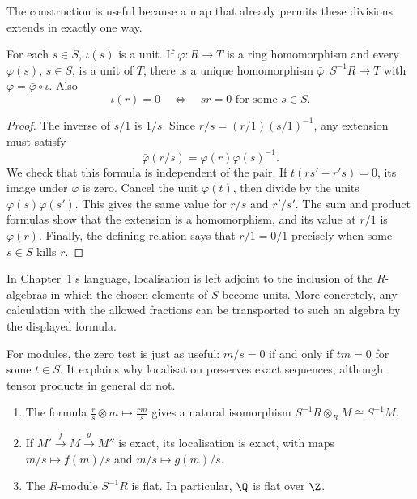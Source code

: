 The construction is useful because a map that already permits these divisions extends in exactly one way.

\begin{proposition}\label{prop:locuniv}
For each $s\in S$, $\iota(s)$ is a unit. If $\varphi\colon R\to T$ is a ring homomorphism and every $\varphi(s)$, $s\in S$, is a unit of $T$, there is a unique homomorphism $\bar\varphi\colon S^{-1}R\to T$ with $\varphi=\bar\varphi\circ\iota$. Also
\[
\iota(r)=0\quad\Longleftrightarrow\quad sr=0\text{ for some }s\in S.
\]
\end{proposition}

\begin{proof}
The inverse of $s/1$ is $1/s$. Since $r/s=(r/1)(s/1)^{-1}$, any extension must satisfy
\[
\bar\varphi(r/s)=\varphi(r)\varphi(s)^{-1}.
\]
We check that this formula is independent of the pair. If $t(rs'-r's)=0$, its image under $\varphi$ is zero. Cancel the unit $\varphi(t)$, then divide by the units $\varphi(s)\varphi(s')$. This gives the same value for $r/s$ and $r'/s'$. The sum and product formulas show that the extension is a homomorphism, and its value at $r/1$ is $\varphi(r)$. Finally, the defining relation says that $r/1=0/1$ precisely when some $s\in S$ kills $r$.
\end{proof}

In Chapter~1's language, localisation is left adjoint to the inclusion of the $R$-algebras in which the chosen elements of $S$ become units. More concretely, any calculation with the allowed fractions can be transported to such an algebra by the displayed formula.

For modules, the zero test is just as useful:
$m/s=0$ if and only if $tm=0$ for some $t\in S$. It explains why localisation preserves exact sequences, although tensor products in general do not.

\begin{proposition}\label{prop:locexact}
\leavevmode
\begin{enumerate}[label=(\alph*)]
\item The formula $\frac rs\otimes m\mapsto\frac{rm}s$ gives a natural isomorphism $S^{-1}R\otimes_RM\cong S^{-1}M$.
\item If $M'\xrightarrow fM\xrightarrow gM''$ is exact, its localisation is exact, with maps $m/s\mapsto f(m)/s$ and $m/s\mapsto g(m)/s$.
\item The $R$-module $S^{-1}R$ is flat. In particular, $\Q$ is flat over $\Z$.
\end{enumerate}
\end{proposition}

